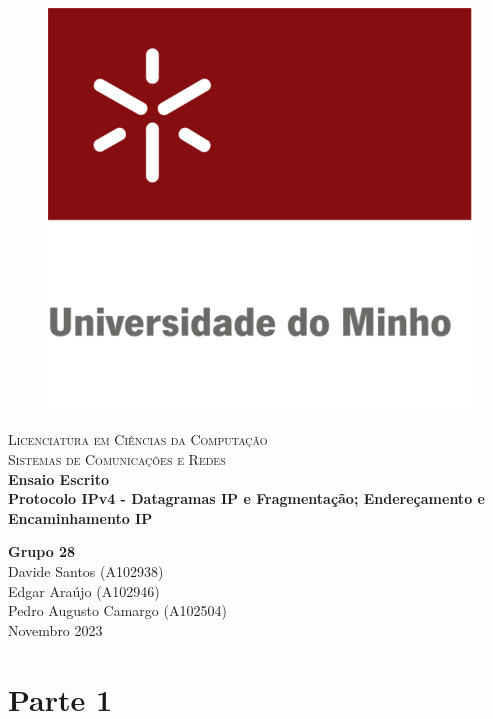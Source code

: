 \documentclass{article}
\begin{document}
\begin{titlepage}

\center %

\newcommand{\HRule}{\rule{\linewidth}{0.4mm}} %

\begin{figure}[h]
    \centering
    \includegraphics[width=0.24\linewidth]{images/uniMinho.jpg}
\end{figure}

\textsc{\Large Licenciatura em Ciências da Computação}\\[0.4cm] %
\textsc{\Large Sistemas de Comunicações e Redes}\\[5cm]

{\Large\bfseries Ensaio Escrito}\\[0.5cm]
{\LARGE \bfseries  Protocolo IPv4 - Datagramas IP e Fragmentação; Endereçamento e Encaminhamento IP} %


\vspace{5cm} %
{\bfseries Grupo 28} \\ \vspace{3mm}
Davide Santos (A102938) \\ \vspace{3mm}
Edgar Araújo (A102946) \\ \vspace{3mm}
Pedro Augusto Camargo (A102504) \\ \vspace{3mm}
\vspace{0.2cm}
{Novembro 2023}\\[0.2cm] %

\vfill %
\end{titlepage}

\tableofcontents
\pagebreak

\section{Parte 1}
\end{document}
